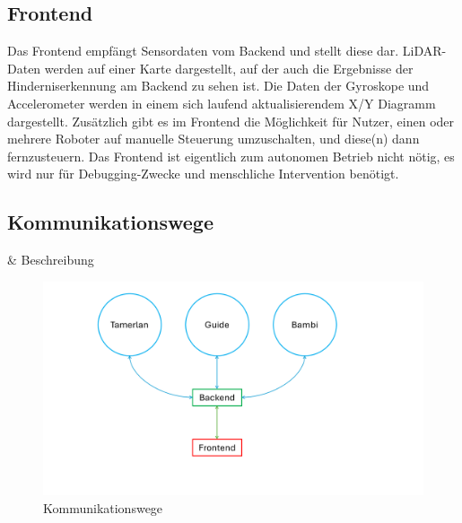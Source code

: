 \subsection{Frontend}
Das Frontend empfängt Sensordaten vom Backend und stellt diese dar.
%
LiDAR-Daten werden auf einer Karte dargestellt,
auf der auch die Ergebnisse der Hinderniserkennung am Backend zu sehen ist.
%
Die Daten der Gyroskope und Accelerometer werden in einem sich laufend aktualisierendem X/Y Diagramm dargestellt.
%
Zusätzlich gibt es im Frontend die Möglichkeit für Nutzer,
einen oder mehrere Roboter auf manuelle Steuerung umzuschalten,
und diese(n) dann fernzusteuern.
%
Das Frontend ist eigentlich zum autonomen Betrieb nicht nötig,
es wird nur für Debugging-Zwecke und menschliche Intervention benötigt.

\subsection{Kommunikationswege}
\label{subsec:ueberblick_comms}
\& Beschreibung
\begin{figure}[H]
    \centering
        \includegraphics[width=\textwidth, center]{img/Kommunikationswege.png}  
    \caption{Kommunikationswege}
    \label{fig:kommunikationswege}
\end{figure}

